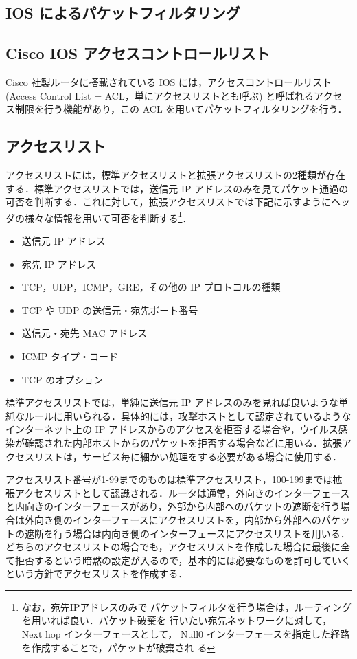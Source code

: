 \subsection{IOS によるパケットフィルタリング}

\subsection*{Cisco IOS アクセスコントロールリスト}
Cisco 社製ルータに搭載されている IOS には，アクセスコントロールリスト
(Access Control List = ACL，単にアクセスリストとも呼ぶ) と呼ばれるアクセ
ス制限を行う機能があり，この ACL を用いてパケットフィルタリングを行う．

\subsection*{アクセスリスト}
アクセスリストには，標準アクセスリストと拡張アクセスリストの2種類が存在
する．標準アクセスリストでは，送信元 IP アドレスのみを見てパケット通過の
可否を判断する．これに対して，拡張アクセスリストでは下記に示すようにヘッ
ダの様々な情報を用いて可否を判断する\footnote{なお，宛先IPアドレスのみで
パケットフィルタを行う場合は，ルーティングを用いれば良い．パケット破棄を
行いたい宛先ネットワークに対して，Next hop インターフェースとして， 
Null0 インターフェースを指定した経路を作成することで，パケットが破棄され
る}．
\begin{itemize}
 \item 送信元 IP アドレス
 \item 宛先 IP アドレス
 \item TCP，UDP，ICMP，GRE，その他の IP プロトコルの種類
 \item TCP や UDP の送信元・宛先ポート番号
 \item 送信元・宛先 MAC アドレス
 \item ICMP タイプ・コード
 \item TCP のオプション
\end{itemize}

標準アクセスリストでは，単純に送信元 IP アドレスのみを見れば良いような単
純なルールに用いられる．具体的には，攻撃ホストとして認定されているような
インターネット上の IP アドレスからのアクセスを拒否する場合や，ウイルス感
染が確認された内部ホストからのパケットを拒否する場合などに用いる．拡張ア
クセスリストは，サービス毎に細かい処理をする必要がある場合に使用する．

アクセスリスト番号が1-99までのものは標準アクセスリスト，100-199までは拡
張アクセスリストとして認識される．ルータは通常，外向きのインターフェース
と内向きのインターフェースがあり，外部から内部へのパケットの遮断を行う場
合は外向き側のインターフェースにアクセスリストを，内部から外部へのパケッ
トの遮断を行う場合は内向き側のインターフェースにアクセスリストを用いる．
どちらのアクセスリストの場合でも，アクセスリストを作成した場合に最後に全
て拒否するという暗黙の設定が入るので，基本的には必要なものを許可していく
という方針でアクセスリストを作成する．

